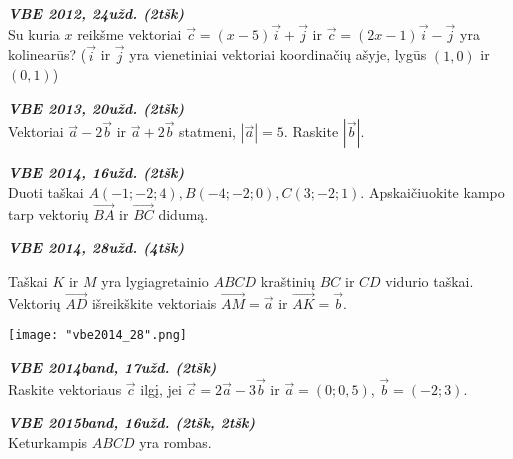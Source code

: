 \documentclass[a4paper]{article}
\newcommand{\tbf}[1]{\textbf{#1}}
\newcommand{\tit}[1]{\textit{#1}}
\begin{document}
\begin{enumerate}
\item  \tbf{\tit{VBE 2012, 24užd. (2tšk)}}\\
Su kuria $x$ reikšme vektoriai $\overrightarrow{c}=(x-5)\overrightarrow{i}+\overrightarrow{j}$ ir $\overrightarrow{c}=(2x-1)\overrightarrow{i}-\overrightarrow{j}$ yra kolinearūs? ($\overrightarrow{i}$ ir $\overrightarrow{j}$ yra vienetiniai vektoriai koordinačių ašyje, lygūs $(1,0)$ ir $(0, 1)$)
\item  \tbf{\tit{VBE 2013, 20užd. (2tšk)}}\\
Vektoriai $\overrightarrow{a}-2\overrightarrow{b}$ ir $\overrightarrow{a}+2\overrightarrow{b}$ statmeni, $|\overrightarrow{a}|=5$. Raskite $|\overrightarrow{b}|$.
\item  \tbf{\tit{VBE 2014, 16užd. (2tšk)}}\\
Duoti taškai $A(-1; -2; 4), B(-4; -2; 0), C(3; -2;1)$. Apskaičiuokite kampo tarp vektorių $\overrightarrow{BA}$ ir $\overrightarrow{BC}$ didumą.
\item \tbf{\tit{VBE 2014, 28užd. (4tšk)}}\\
\begin{minipage}[c]{0.5\linewidth}
Taškai $K$ ir $M$ yra lygiagretainio $ABCD$ kraštinių $BC$ ir $CD$ vidurio taškai. Vektorių
$\overrightarrow{AD}$ išreikškite vektoriais $\overrightarrow{AM}=\overrightarrow{a}$ ir $\overrightarrow{AK}= \overrightarrow{b}$.
\end{minipage}
\hspace{\fill} \begin{minipage}{0.4\linewidth} \texttt{[image: "vbe2014\_28".png]}\end{minipage}
\begin{minipage}[b]{0.7\linewidth}
\item  \tbf{\tit{VBE 2014band, 17užd. (2tšk)}}\\
Raskite vektoriaus $\overrightarrow{c}$ ilgį, jei $\overrightarrow{c}=2\overrightarrow{a}-3\overrightarrow{b}$ ir $\overrightarrow{a}=(0; 0,5)$, $\overrightarrow{b}=(-2; 3)$.
\item  \tbf{\tit{VBE 2015band, 16užd. (2tšk, 2tšk)}}\\
Keturkampis $ABCD$ yra rombas. 

\end{minipage}
\end{enumerate}
\end{document}
